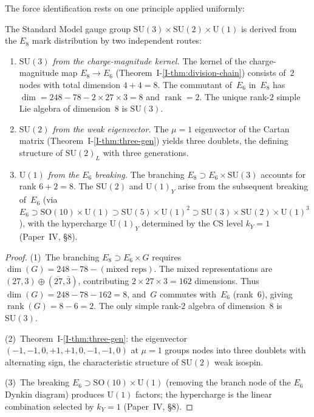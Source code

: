 The force identification rests on one principle applied uniformly:

\begin{theorem}\label{thm:gauge-derivation}
The Standard Model gauge group $\mathrm{SU}(3) \times \mathrm{SU}(2) \times \mathrm{U}(1)$
is derived from the $E_8$ mark distribution by two independent routes:
\begin{enumerate}
\item \emph{$\mathrm{SU}(3)$ from the charge-magnitude kernel.}
  The kernel of the charge-magnitude map $E_8 \to E_6$
  (Theorem~I-\ref{I-thm:division-chain}) consists of~$2$ nodes
  with total dimension $4 + 4 = 8$.
  The commutant of~$E_6$ in~$E_8$ has $\dim = 248 - 78 - 2 \times 27 \times 3 = 8$
  and $\operatorname{rank} = 2$.
  The unique rank-$2$ simple Lie algebra of dimension~$8$ is $\mathrm{SU}(3)$.

\item \emph{$\mathrm{SU}(2)$ from the weak eigenvector.}
  The $\mu = 1$ eigenvector of the Cartan matrix
  (Theorem~I-\ref{I-thm:three-gen}) yields three doublets, the
  defining structure of $\mathrm{SU}(2)_L$ with three generations.

\item \emph{$\mathrm{U}(1)$ from the $E_6$ breaking.}
  The branching $E_8 \supset E_6 \times \mathrm{SU}(3)$ accounts for
  rank $6 + 2 = 8$.  The $\mathrm{SU}(2)$ and $\mathrm{U}(1)_Y$ arise
  from the subsequent breaking of~$E_6$ (via $E_6 \supset \mathrm{SO}(10) \times \mathrm{U}(1)
  \supset \mathrm{SU}(5) \times \mathrm{U}(1)^2 \supset
  \mathrm{SU}(3) \times \mathrm{SU}(2) \times \mathrm{U}(1)^3$),
  with the hypercharge $\mathrm{U}(1)_Y$ determined by
  the CS level $k_Y = 1$ (Paper~IV, \S8).
\end{enumerate}
\end{theorem}

\begin{proof}
(1)~The branching $E_8 \supset E_6 \times G$ requires
$\dim(G) = 248 - 78 - (\text{mixed reps})$.
The mixed representations are $(27,3) \oplus (\overline{27},\bar{3})$,
contributing $2 \times 27 \times 3 = 162$ dimensions.
Thus $\dim(G) = 248 - 78 - 162 = 8$, and~$G$ commutes with~$E_6$
(rank~$6$), giving $\operatorname{rank}(G) = 8 - 6 = 2$.
The only simple rank-$2$ algebra of dimension~$8$ is~$\mathrm{SU}(3)$.

(2)~Theorem~I-\ref{I-thm:three-gen}: the eigenvector
$(-1,-1,0,+1,+1,0,-1,-1,0)$ at $\mu = 1$ groups nodes into
three doublets with alternating sign, the characteristic structure
of $\mathrm{SU}(2)$ weak isospin.

(3)~The breaking $E_6 \supset \mathrm{SO}(10) \times \mathrm{U}(1)$
(removing the branch node of the $E_6$ Dynkin diagram)
produces $\mathrm{U}(1)$ factors; the hypercharge is the linear
combination selected by $k_Y = 1$ (Paper~IV, \S8).
\end{proof}

